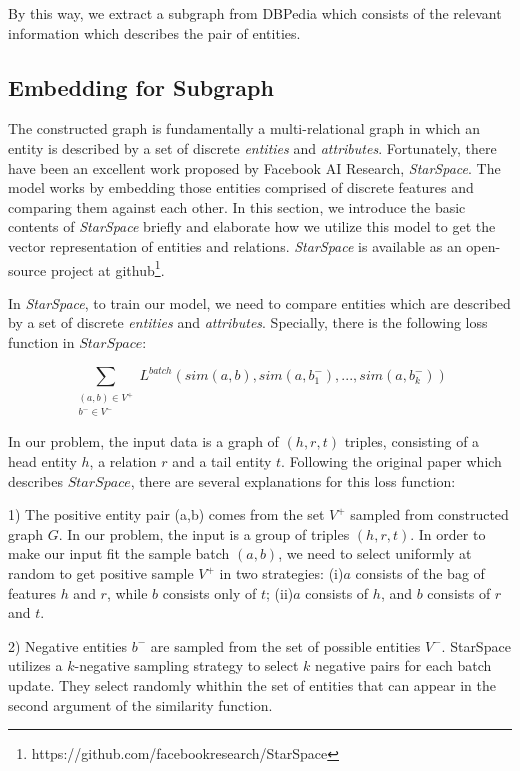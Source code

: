 By this way, we extract a subgraph from DBPedia which consists of the relevant information which describes
the pair of entities.

\subsection{Embedding for Subgraph}
\label{sec:train}
The constructed graph is fundamentally a multi-relational graph in which an entity is described by a set of discrete
\emph{entities} and \emph{attributes}. Fortunately, there have been an excellent work proposed by Facebook AI Research,
\emph{StarSpace}\cite{corr/Ledell17}. The model works by embedding those entities comprised of discrete features and
comparing them against each other. In this section, we introduce the basic contents of \emph{StarSpace} briefly and 
elaborate how we utilize this model to get the vector representation of entities and relations. \emph{StarSpace} is available as
an open-source project at github\footnote{https://github.com/facebookresearch/StarSpace}.

In \emph{StarSpace}, to train our model, we need to compare entities which are described by a set of discrete
\emph{entities} and \emph{attributes}. Specially, there is the following loss function in $StarSpace$:

\begin{small}
    \begin{equation}
        \nonumber
        \label{starspace_formula}
        \sum_{\substack{(a,b) \in V^+\\ b^- \in V^-}}L^{batch}(sim(a,b),sim(a,b_1^-),...,sim(a,b_k^-))
    \end{equation}
\end{small}
In our problem, the input data is a graph of $(h, r, t)$ triples, consisting of a head entity $h$, 
a relation $r$ and a tail entity $t$.
Following the original paper which describes $StarSpace$, there are several explanations for this loss function:

1) The positive entity pair (a,b) comes from the set $V^+$ sampled from constructed graph $G$. 
In our problem, the input is a group of triples $(h, r, t)$. In order to make our input fit
the sample batch $(a, b)$, we need to select uniformly at random to get positive sample $V^+$ in two strategies:
(i)$a$ consists of the bag of features $h$ and $r$, while $b$ consists only of $t$; 
(ii)$a$ consists of $h$, and $b$ consists of $r$ and $t$. 

2) Negative entities $b^-$ are sampled from the set of possible entities $V^-$.  
StarSpace utilizes a $k$-negative sampling strategy\cite{corr/Mikolov13} to select $k$ negative pairs for each batch update. 
They select randomly whithin the set of entities that can appear in the second argument of the similarity function.

